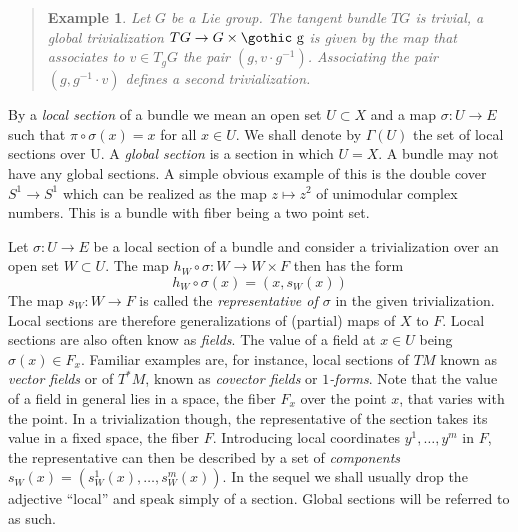 \documentclass[12pt,titlepage]{article}
\def\goth#1{\hbox{\gothic #1}}
\def\gg{{\goth g}}
\newtheorem{eg}{Example}
\newenvironment{example}{\begin{quote}\begin{eg}}{\end{eg}\end{quote}}
\begin{document}
\begin{example}
Let \(G\) be a Lie group. The tangent bundle \(TG\) is trivial, a
global trivialization \(TG \to G \times \gg\) is given by the map
that associates to \(v\in T_gG\) the pair \((g, v\cdot g^{-1})\).
Associating the pair \((g, g^{-1}\cdot v)\) defines a second
trivialization.
\end{example}

By a {\em local section\/} 
%
 of a bundle we mean an open set \(U\subset X\)
and a map \(\sigma: U \to E\) such that \(\pi\circ\sigma (x) = x\) for
all \(x\in U\).  We shall denote by \(\Gamma(U)\)
%
 the set of local
sections over U. A {\em global section\/}
%
 is a section in which \(U=X\).
A bundle may not have any global sections. A simple obvious 
example of this is
the double cover \(S^1\to S^1\) which can be realized as the map
\(z\mapsto z^2\) of  unimodular complex numbers. 
This is a
bundle with fiber being a two point set. 



Let \(\sigma:U \to E\) be a local section of a bundle and consider a
trivialization over an open set \(W\subset U\). The map \(h_W\circ
\sigma:W\to W\times F\) then has the form 
\begin{equation}\label{eq:locsec}
h_W\circ\sigma(x) = (x, s_W(x))
\end{equation}%
 The map \(s_W:W \to F\) is called the {\em representative of
\(\sigma\)\/} 
%
in the given  trivialization. Local sections are therefore
generalizations of (partial) maps of \(X\) to \(F\).
Local sections are also often know as {\em fields\/}.
%
The value of a field at \(x\in U\) being \(\sigma(x)\in F_x\). Familiar 
examples are, for instance, local
sections of \(TM\) known as {\em vector fields\/} or of \(T^*M\),  known
as {\em covector fields\/} or  {\em \(1\)-forms\/}. 
Note that the value of a field in general lies in
a space, the fiber \(F_x\) over the  point \(x\), that varies 
with the point. 
In a trivialization 
though,
the representative of the section takes its value in a fixed space, the
fiber \(F\). Introducing local coordinates \(y^1,\dots,y^m\) in \(F\), 
the representative  can
then be described by a set of {\em components\/} 
\(s_W(x)= (s^1_W(x),\dots,s^m_W(x))\). In the sequel we shall usually
drop the adjective ``local'' and speak simply of a section. Global
sections will be referred to as such. 
\end{document}

